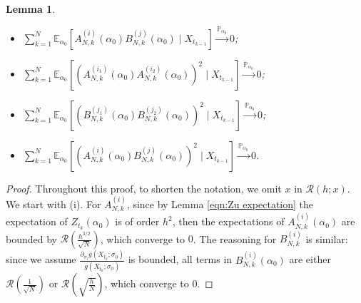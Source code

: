 \documentclass[a4paper,12pt]{article}
\numberwithin{equation}{section}
\theoremstyle{plain}
\newtheorem{lemma}[theorem]{Lemma}
\theoremstyle{definition}
\begin{document}
\begin{appendix}
\begin{lemma}
\begin{itemize}
        \item[(viii)] $\sum_{k=1}^N \mathbb{E}_{\alpha_0}\left[A_{N, k}^{\left(i\right)}\left(\alpha_0\right) B_{N, k}^{\left(j\right)}\left(\alpha_0\right) \mid X_{t_{k-1}}\right] \xrightarrow{\mathbb{P}_{\alpha_0}}0$;
        \item[(ix)] $\sum_{k=1}^N \mathbb{E}_{\alpha_0}\left[\left(A_{N, k}^{\left(i_1\right)}\left(\alpha_0\right) A_{N, k}^{\left(i_2\right)}\left(\alpha_0\right)\right)^2 \mid X_{t_{k-1}}\right] \xrightarrow{\mathbb{P}_{\alpha_0}} 0$;
        \item[(x)] $\sum_{k=1}^N \mathbb{E}_{\alpha_0}\left[\left(B_{N, k}^{\left(j_1\right)}\left(\alpha_0\right) B_{N, k}^{\left(j_2\right)}\left(\alpha_0\right)\right)^2 \mid X_{t_{k-1}}\right] \xrightarrow{\mathbb{P}_{\alpha_0}} 0$;
        \item[(xi)]  $\sum_{k=1}^N \mathbb{E}_{\alpha_0}\left[\left(A_{N, k}^{\left(i\right)}\left(\alpha_0\right) B_{N, k}^{\left(j\right)}\left(\alpha_0\right)\right)^2 \mid X_{t_{k-1}}\right] \xrightarrow{\mathbb{P}_{\alpha_0}} 0$.
    \end{itemize}
\end{lemma}
\begin{proof}
Throughout this proof, to shorten the notation, we omit $x$ in $\mathcal{R}(h;x)$. 
    We start with (i). For $A^{(i)}_{N,k}$, since by Lemma \ref{eqn:Zu expectation} the expectation of $Z_{t_k}(\alpha_0)$ is of order $h^2$, then the expectations of $A^{(i)}_{N,k}(\alpha_0)$ are bounded by $\mathcal{R}(\frac{h^{3/2}}{\sqrt{N}})$, which converge to $0$. The reasoning for $B^{(i)}_{N,k}$ is similar: since we assume $\frac{\partial_{\sigma_i} g\left(X_{t_k} ; \sigma_0\right)}{g\left(X_{t_k} ; \sigma_0\right)}$ is bounded, all terms in $B^{(i)}_{N,k}(\alpha_0)$ are either $\mathcal{R}(\frac{1}{\sqrt{N}})$ or $\mathcal{R}(\sqrt{\frac{h}{N}})$, which converge to $0$.
    

\end{proof}
\end{appendix}
\end{document}
